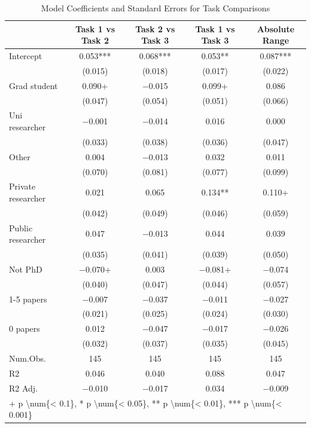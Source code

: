 \documentclass[
  letterpaper,
  DIV=11,
  numbers=noendperiod]{scrartcl}
\begin{document}
\begin{table}
\centering
\caption{Model Coefficients and Standard Errors for Task Comparisons\label{tab-researcher-characteristics-regs-b}}
\centering
\begin{tabular}[t]{lcccc}
\toprule
  & Task 1 vs Task 2 & Task 2 vs Task 3 & Task 1 vs Task 3 & Absolute Range\\
\midrule
Intercept & \num{0.053}*** & \num{0.068}*** & \num{0.053}** & \num{0.087}***\\
 & (\num{0.015}) & (\num{0.018}) & (\num{0.017}) & (\num{0.022})\\
Grad student & \num{0.090}+ & \num{-0.015} & \num{0.099}+ & \num{0.086}\\
 & (\num{0.047}) & (\num{0.054}) & (\num{0.051}) & (\num{0.066})\\
Uni researcher & \num{-0.001} & \num{-0.014} & \num{0.016} & \num{0.000}\\
 & (\num{0.033}) & (\num{0.038}) & (\num{0.036}) & (\num{0.047})\\
Other & \num{0.004} & \num{-0.013} & \num{0.032} & \num{0.011}\\
 & (\num{0.070}) & (\num{0.081}) & (\num{0.077}) & (\num{0.099})\\
Private researcher & \num{0.021} & \num{0.065} & \num{0.134}** & \num{0.110}+\\
 & (\num{0.042}) & (\num{0.049}) & (\num{0.046}) & (\num{0.059})\\
Public researcher & \num{0.047} & \num{-0.013} & \num{0.044} & \num{0.039}\\
 & (\num{0.035}) & (\num{0.041}) & (\num{0.039}) & (\num{0.050})\\
Not PhD & \num{-0.070}+ & \num{0.003} & \num{-0.081}+ & \num{-0.074}\\
 & (\num{0.040}) & (\num{0.047}) & (\num{0.044}) & (\num{0.057})\\
1-5 papers & \num{-0.007} & \num{-0.037} & \num{-0.011} & \num{-0.027}\\
 & (\num{0.021}) & (\num{0.025}) & (\num{0.024}) & (\num{0.030})\\
0 papers & \num{0.012} & \num{-0.047} & \num{-0.017} & \num{-0.026}\\
 & (\num{0.032}) & (\num{0.037}) & (\num{0.035}) & (\num{0.045})\\
\midrule
Num.Obs. & \num{145} & \num{145} & \num{145} & \num{145}\\
R2 & \num{0.046} & \num{0.040} & \num{0.088} & \num{0.047}\\
R2 Adj. & \num{-0.010} & \num{-0.017} & \num{0.034} & \num{-0.009}\\
\bottomrule
\multicolumn{5}{l}{\rule{0pt}{1em}+ p \textbackslash{}num\{< 0.1\}, * p \textbackslash{}num\{< 0.05\}, ** p \textbackslash{}num\{< 0.01\}, *** p \textbackslash{}num\{< 0.001\}}\\
\end{tabular}
\end{table}
\end{document}
